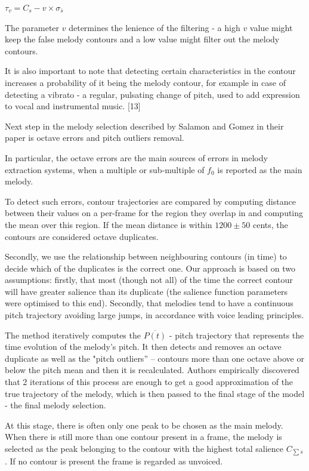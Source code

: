 $\tau_{v} = C_{s} - v \times \sigma_{\overline{s}}$

The parameter $v$ determines the lenience of the filtering - a high $v$ value might keep the false melody contours and a low value might filter out the melody contours.

It is also important to note that detecting certain characteristics in the contour increases a probability of it being the melody contour, for example in case of detecting a vibrato -  a regular, pulsating change of pitch, used to add expression to vocal and instrumental music. [13]

Next step in the melody selection described by Salamon and Gomez in their paper is octave errors and pitch outliers removal.  

In particular, the octave errors are the main sources of errors in melody extraction systems, when a multiple or sub-multiple of $f_{0}$ is reported as the main melody. 

To detect such errors, contour trajectories are compared by computing distance between their values on a per-frame for the region they overlap in and computing the mean over this region.
If the mean distance is within $1200\pm50$ cents, the contours are considered octave duplicates.

Secondly, we use the relationship between neighbouring contours (in time) to decide which of the duplicates is the correct one. Our approach is based on two assumptions: firstly, that most (though not all) of the time the correct contour will have greater salience than its duplicate (the salience function parameters were optimised to this end). Secondly, that melodies tend to have a continuous pitch trajectory avoiding large jumps, in accordance with voice leading principles.

The method iteratively computes the $\overline{P(t)}$ - pitch trajectory that represents the time evolution of the melody's pitch.
It then detects and removes an octave duplicate as well as  the "pitch outliers” – contours more than one octave above or below the pitch mean and then it is recalculated. Authors empirically discovered that 2 iterations of this process are enough to get a good approximation of the true trajectory of the melody, which is then passed to the final stage of the model - the final melody selection.

At this stage, there is often only one peak to be chosen as the main melody. When there is still more than one contour present in a frame, the melody is selected as the peak belonging to the contour with the highest total salience $C_{\sum s}$. If no contour is present the frame is regarded as unvoiced.

